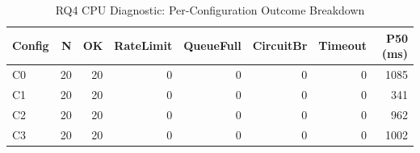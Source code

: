 \begin{table}[htbp]
\caption{RQ4 CPU Diagnostic: Per-Configuration Outcome Breakdown}
\label{tab:rq4-phase4-cpu}
\centering\small
\begin{tabular}{lrrrrrrr}
\toprule
\textbf{Config} & \textbf{N} & \textbf{OK} & \textbf{RateLimit} & \textbf{QueueFull} & \textbf{CircuitBr} & \textbf{Timeout} & \textbf{P50 (ms)} \\
\midrule
  C0 & 20 & 20 & 0 & 0 & 0 & 0 & 1085 \\
  C1 & 20 & 20 & 0 & 0 & 0 & 0 & 341 \\
  C2 & 20 & 20 & 0 & 0 & 0 & 0 & 962 \\
  C3 & 20 & 20 & 0 & 0 & 0 & 0 & 1002 \\
\bottomrule
\end{tabular}
\end{table}